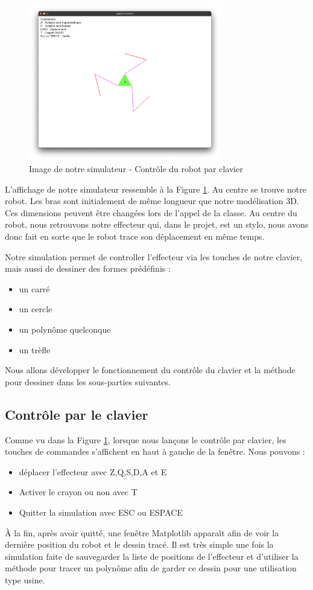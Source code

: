 \documentclass[a4paper, 11pt]{report}
\begin{document}
\begin{figure}[!htb]
    \centering
    \includegraphics[width=0.75\textwidth]{Figures/image_affichagesimu.png}
    \caption{Image de notre simulateur - Contrôle du robot par clavier}
    \label{fig:image_simu}
\end{figure}
L'affichage de notre simulateur ressemble à la Figure \ref{fig:image_simu}. Au centre se trouve notre robot. Les bras sont initialement de même longueur que notre modélisation 3D. Ces dimensions peuvent être changées lors de l'appel de la classe. Au centre du robot, nous retrouvons notre effecteur qui, dans le projet, est un stylo, nous avons donc fait en sorte que le robot trace son déplacement en même temps. 

Notre simulation permet de controller l'effecteur via les touches de notre clavier, mais aussi de dessiner des formes prédéfinis :
\begin{itemize}
    \item un carré
    \item un cercle
    \item un polynôme quelconque
    \item un trèfle
\end{itemize}
Nous allons développer le fonctionnement du contrôle du clavier et la méthode pour dessiner dans les sous-parties suivantes.

\subsection{Contrôle par le clavier}
Comme vu dans la Figure \ref{fig:image_simu}, lorsque nous lançons le contrôle par clavier, les touches de commandes s'affichent en haut à gauche de la fenêtre. Nous pouvons :
\begin{itemize}
    \item déplacer l'effecteur avec Z,Q,S,D,A et E
    \item Activer le crayon ou non avec T
    \item Quitter la simulation avec ESC ou ESPACE
\end{itemize}
À la fin, après avoir quitté, une fenêtre Matplotlib apparaît afin de voir la dernière position du robot et le dessin tracé. Il est très simple une fois la simulation faite de sauvegarder la liste de positions de l'effecteur et d'utiliser la méthode pour tracer un polynôme afin de garder ce dessin pour une utilisation type usine.
\end{document}
